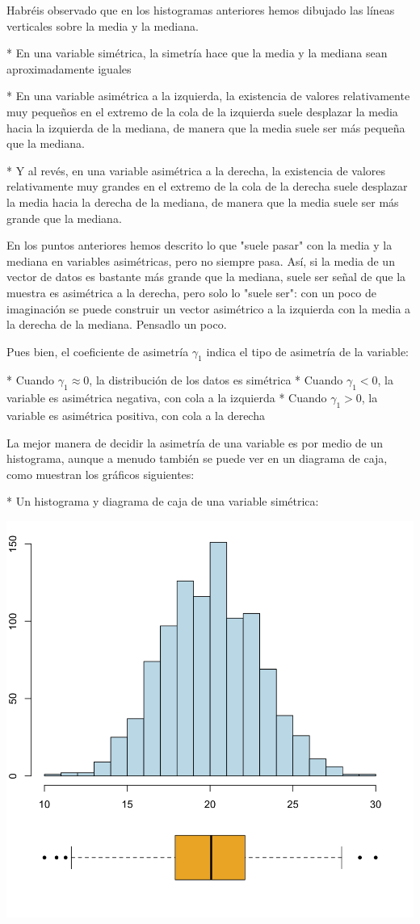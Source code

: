 \documentclass[
]{book}
\theoremstyle{definition}
\theoremstyle{definition}
\theoremstyle{definition}
\theoremstyle{definition}
\theoremstyle{remark}
\begin{document}
Habréis observado que en los histogramas anteriores hemos dibujado las líneas verticales sobre la media y la mediana.

* En una variable simétrica, la simetría hace que la media y la mediana sean aproximadamente iguales

* En una variable asimétrica a la izquierda, la existencia de valores relativamente muy pequeños en el extremo de la cola de la izquierda suele desplazar la media hacia la izquierda de la mediana, de manera que la media suele ser más pequeña que la mediana.

* Y al revés, en una variable asimétrica a la derecha, la existencia de valores relativamente muy grandes en el extremo de la cola de la derecha suele desplazar la media hacia la derecha de la mediana, de manera que la media suele ser más grande que la mediana.



\begin{rmdcaution}
En los puntos anteriores hemos descrito lo que "suele pasar" con la media y la mediana en variables asimétricas, pero no siempre pasa. Así, si la media de un vector de datos es bastante más grande que la mediana, suele ser señal de que la 
muestra es asimétrica a la derecha, pero solo lo "suele ser": con un poco de imaginación se puede construir un vector asimétrico a la izquierda con la media a la derecha de la mediana. Pensadlo un poco.
\end{rmdcaution}



Pues bien, el coeficiente de asimetría $\gamma_1$ indica el tipo de asimetría de la variable:

* Cuando $\gamma_1\approx 0$, la distribución de los datos es simétrica
* Cuando $\gamma_1< 0$, la variable es asimétrica negativa, con cola a la izquierda
* Cuando $\gamma_1> 0$, la variable es asimétrica positiva, con cola a la derecha

La mejor manera de decidir la asimetría de una variable es por medio de un histograma, aunque a menudo también se puede ver en un diagrama de caja, como muestran los gráficos siguientes:

* Un histograma y diagrama de caja de una variable simétrica:

\begin{center}\includegraphics[width=0.6\linewidth]{INREMDN_files/figure-html/histvsbpsim} \end{center}
\end{document}
